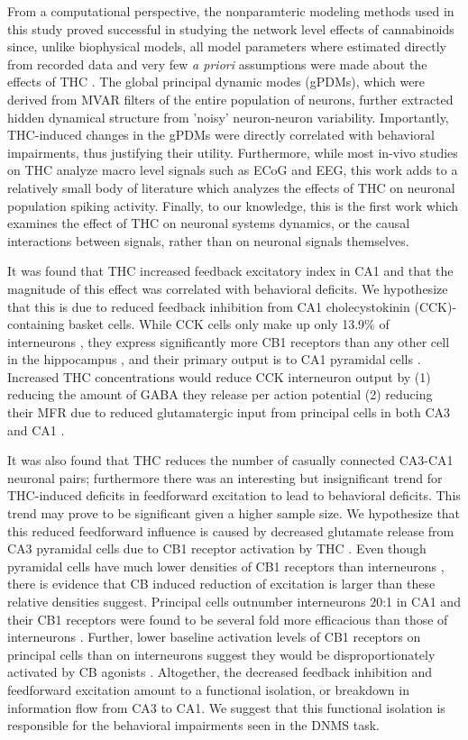 \documentclass[11pt,a4paper,final]{article}
\begin{document}
From a computational perspective, the nonparamteric modeling methods used in this study proved successful in studying the network level effects of cannabinoids since, unlike biophysical models, all model parameters where estimated directly from recorded data and very few \textit{a priori} assumptions were made about the effects of THC \citep{marm04,song09par1,sandler15}.
The global principal dynamic modes (gPDMs), which were derived from MVAR filters of the entire population of neurons, further extracted hidden dynamical structure from 'noisy' neuron-neuron variability.
Importantly, THC-induced changes in the gPDMs were directly correlated with behavioral impairments, thus justifying their utility.
Furthermore, while most in-vivo studies on THC analyze macro level signals such as ECoG and EEG, this work adds to a relatively small body of literature which analyzes the effects of THC on neuronal population spiking activity.
Finally, to our knowledge, this is the first work which examines the effect of THC on neuronal systems dynamics, or the causal interactions between signals, rather than on neuronal signals themselves.

It was found that THC increased feedback excitatory index in CA1 and that the magnitude of this effect was correlated with behavioral deficits. 
We hypothesize that this is due to reduced feedback inhibition from CA1 cholecystokinin (CCK)-containing basket cells.
While CCK cells only make up only 13.9\% of interneurons \citep{bezaire13}, they express significantly more CB1 receptors than any other cell in the hippocampus \citep{katona00}, and their primary output is to CA1 pyramidal cells \citep{bezaire13}.
Increased THC concentrations would reduce CCK interneuron output by (1) reducing the amount of GABA they release per action potential (2) reducing their MFR due to reduced glutamatergic input from principal cells in both CA3 and CA1 \citep{gulyas04,lee10}.

It was also found that THC reduces the number of casually connected CA3-CA1 neuronal pairs; furthermore there was an interesting but insignificant trend for THC-induced deficits in feedforward excitation to lead to behavioral deficits.
This trend may prove to be significant given a higher sample size. 
We hypothesize that this reduced feedforward influence is caused by decreased glutamate release from CA3 pyramidal cells due to CB1 receptor activation by THC \citep{shen96}.
Even though pyramidal cells have much lower densities of CB1 receptors than interneurons \citep{katona00,ohno02}, there is evidence that CB induced reduction of excitation is larger than these relative densities suggest. 
Principal cells outnumber interneurons 20:1 in CA1 \citep{mehta09} and their CB1 receptors were found to be several fold more efficacious than those of interneurons \citep{steindel13}. 
Further, lower baseline activation levels of CB1 receptors on principal cells than on interneurons suggest they would be disproportionately activated by CB agonists \citep{ruehle12}. 
Altogether, the decreased feedback inhibition and feedforward excitation amount to a functional isolation, or breakdown in information flow from CA3 to CA1.
We suggest that this functional isolation is responsible for the behavioral impairments seen in the DNMS task.
\end{document}
